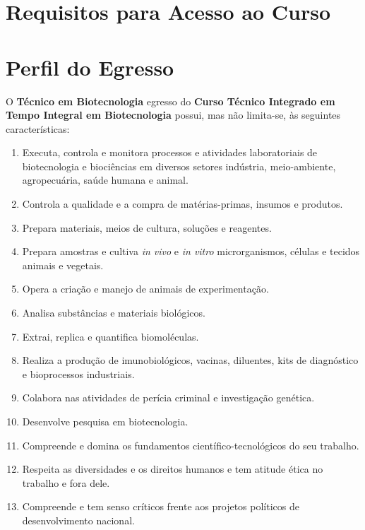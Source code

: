 \documentclass[11pt,fleqn]{book} %
\begin{document}
\section{Requisitos para Acesso ao Curso}



\section{Perfil do Egresso}
\indent

O \textbf{Técnico em Biotecnologia} egresso do \textbf{Curso Técnico Integrado em Tempo Integral em Biotecnologia} possui, mas não limita-se, às seguintes características:

\begin{enumerate}
	\item\label{perfil01} Executa, controla e monitora processos e atividades laboratoriais de biotecnologia e biociências em diversos setores indústria, meio-ambiente, agropecuária, saúde humana e animal.
	\item\label{perfil02} Controla a qualidade e a compra de matérias-primas, insumos e produtos.
	\item\label{perfil03} Prepara materiais, meios de cultura, soluções e reagentes.
	\item\label{perfil04} Prepara amostras e cultiva \textit{in vivo} e \textit{in vitro} microrganismos, células e tecidos animais e vegetais.
	\item\label{perfil05} Opera a criação e manejo de animais de experimentação.
	\item\label{perfil06} Analisa substâncias e materiais biológicos.
	\item\label{perfil07} Extrai, replica e quantifica biomoléculas.
	\item\label{perfil08} Realiza a produção de imunobiológicos, vacinas, diluentes, kits de diagnóstico e bioprocessos industriais.
	\item\label{perfil09} Colabora nas atividades de perícia criminal e investigação genética. 
	\item\label{perfil10} Desenvolve pesquisa em biotecnologia.
	\item\label{perfil11} Compreende e domina os fundamentos científico-tecnológicos do seu trabalho.
	\item\label{perfil12} Respeita as diversidades e os direitos humanos e tem atitude ética no trabalho e fora dele.
	\item\label{perfil13} Compreende e tem senso críticos frente aos projetos políticos de desenvolvimento nacional.

\end{enumerate}
\end{document}
